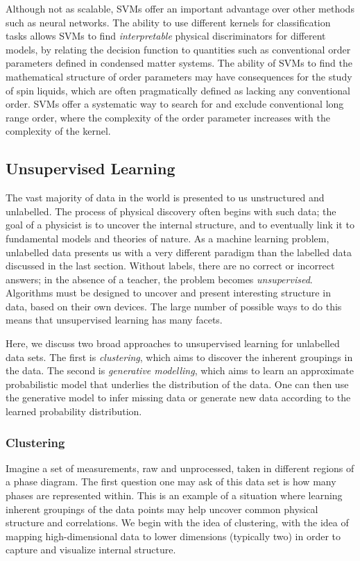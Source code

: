 \documentclass[aps,prb,floatfix,amsmath,amssymb,amsfonts,10pt,floatfix,longbibliography]{revtex4-1}
\begin{document}
Although not as scalable, SVMs offer an important advantage over other methods such as neural networks. The ability to use different kernels for classification tasks allows SVMs to find {\it interpretable} physical discriminators for different models, 
by relating the decision function to quantities such as conventional order parameters defined in condensed matter systems.
The ability of SVMs to find the mathematical structure of order parameters may have consequences for the study of spin liquids, which are often pragmatically defined as lacking any conventional order.  SVMs offer a systematic way to search for and exclude conventional long range order, where the complexity of the order parameter increases with the complexity of the kernel.


\subsection{Unsupervised Learning}

The vast majority of data in the world is presented to us unstructured and unlabelled.  The process of physical discovery often begins with such data; the goal of a physicist is to uncover the internal structure, and to eventually link it to fundamental models and theories of nature.  As a machine learning problem, unlabelled data presents us with a very different paradigm than the labelled data discussed in the last section.  Without labels, there are no correct or incorrect answers; in the absence of a teacher, the problem becomes {\it unsupervised}.  Algorithms must be designed to uncover and present interesting structure in data, based on their own devices.  The large number of possible ways to do this means that unsupervised learning has many facets.  

Here, we discuss two broad approaches to unsupervised learning for unlabelled data sets. The first is {\it clustering}, which aims to discover the inherent groupings in the data.  The second is {\it generative modelling}, which aims to learn an approximate probabilistic model that underlies the distribution of the data. One can then use the generative model to infer missing data or generate new data according to the learned probability distribution. 

\subsubsection{Clustering}

Imagine a set of measurements, raw and unprocessed, taken in different regions of a phase diagram.  The first question one may ask of this data set is how many phases are represented within.  This is an example of a situation where learning inherent groupings of the data points may help uncover common physical structure and correlations.  We begin with the idea of clustering, with the idea of mapping high-dimensional data to lower dimensions (typically two) in order to capture and visualize internal structure.
\end{document}
